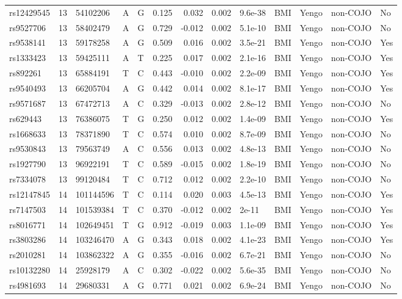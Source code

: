 \documentclass[11pt,twoside]{bristolthesis}
\begin{document}
\begin{longtable}[t]{lrlllrrrlllll}
rs12429545 & 13 & 54102206 & A & G & 0.125 & 0.032 & 0.002 & 9.6e-38 & BMI & Yengo & non-COJO & No\\
rs9527706 & 13 & 58402479 & A & G & 0.729 & -0.012 & 0.002 & 5.1e-10 & BMI & Yengo & non-COJO & No\\
rs9538141 & 13 & 59178258 & A & G & 0.509 & 0.016 & 0.002 & 3.5e-21 & BMI & Yengo & non-COJO & Yes\\
rs1333423 & 13 & 59425111 & A & T & 0.225 & 0.017 & 0.002 & 2.1e-16 & BMI & Yengo & non-COJO & Yes\\
\addlinespace
rs892261 & 13 & 65884191 & T & C & 0.443 & -0.010 & 0.002 & 2.2e-09 & BMI & Yengo & non-COJO & Yes\\
rs9540493 & 13 & 66205704 & A & G & 0.442 & 0.014 & 0.002 & 8.1e-17 & BMI & Yengo & non-COJO & Yes\\
rs9571687 & 13 & 67472713 & A & C & 0.329 & -0.013 & 0.002 & 2.8e-12 & BMI & Yengo & non-COJO & No\\
rs629443 & 13 & 76386075 & T & G & 0.250 & 0.012 & 0.002 & 1.4e-09 & BMI & Yengo & non-COJO & Yes\\
rs1668633 & 13 & 78371890 & T & C & 0.574 & 0.010 & 0.002 & 8.7e-09 & BMI & Yengo & non-COJO & No\\
\addlinespace
rs9530843 & 13 & 79563749 & A & C & 0.556 & 0.013 & 0.002 & 4.8e-13 & BMI & Yengo & non-COJO & No\\
rs1927790 & 13 & 96922191 & T & C & 0.589 & -0.015 & 0.002 & 1.8e-19 & BMI & Yengo & non-COJO & No\\
rs7334078 & 13 & 99120484 & T & C & 0.712 & 0.012 & 0.002 & 2.2e-10 & BMI & Yengo & non-COJO & No\\
rs12147845 & 14 & 101144596 & T & C & 0.114 & 0.020 & 0.003 & 4.5e-13 & BMI & Yengo & non-COJO & Yes\\
rs7147503 & 14 & 101539384 & T & C & 0.370 & -0.012 & 0.002 & 2e-11 & BMI & Yengo & non-COJO & Yes\\
\addlinespace
rs8016771 & 14 & 102649451 & T & G & 0.912 & -0.019 & 0.003 & 1.1e-09 & BMI & Yengo & non-COJO & Yes\\
rs3803286 & 14 & 103246470 & A & G & 0.343 & 0.018 & 0.002 & 4.1e-23 & BMI & Yengo & non-COJO & Yes\\
rs2010281 & 14 & 103862322 & A & G & 0.355 & -0.016 & 0.002 & 6.7e-21 & BMI & Yengo & non-COJO & No\\
rs10132280 & 14 & 25928179 & A & C & 0.302 & -0.022 & 0.002 & 5.6e-35 & BMI & Yengo & non-COJO & No\\
rs4981693 & 14 & 29680331 & A & G & 0.771 & 0.021 & 0.002 & 6.9e-24 & BMI & Yengo & non-COJO & No\\

\end{longtable}
\end{document}
